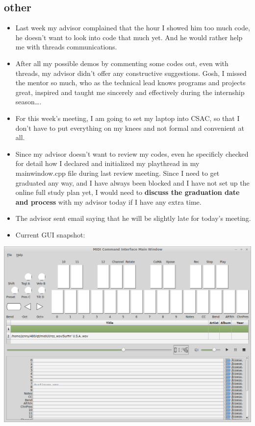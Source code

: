 \documentclass[9pt,b5paper]{article}
\begin{document}
\subsection{other}
\label{sec-1-2}
\begin{itemize}
\item Last week my advisor complained that the hour I showed him too much code, he doesn't want to look into code that much yet. And he would rather help me with threads communications.
\item After all my possible demos by commenting some codes out, even with threads, my advisor didn't offer any constructive suggestions. Gosh, I missed the mentor so much, who as the technical lead knows programs and projects great, inspired and taught me sincerely and effectively during the internship season\ldots{}.
\item For this week's meeting, I am going to set my laptop into CSAC, so that I don't have to put everything on my knees and not formal and convenient at all.
\item Since my advisor doesn't want to review my codes, even he specificly checked for detail how I declared and initialized my playthread in my mainwindow.cpp file during last review meeting. Since I need to get graduated any way, and I have always been blocked and I have not set up the online full study plan yet, I would need to \textbf{discuss the graduation date and process} with my advisor today if I have any extra time.
\item The advisor sent email saying that he will be slightly late for today's meeting.
\item Current GUI snapshot:
\end{itemize}

\includegraphics[width=.9\linewidth]{./pic/Screenshot_from_2015-03-08_13:31:00.png}
\end{document}
